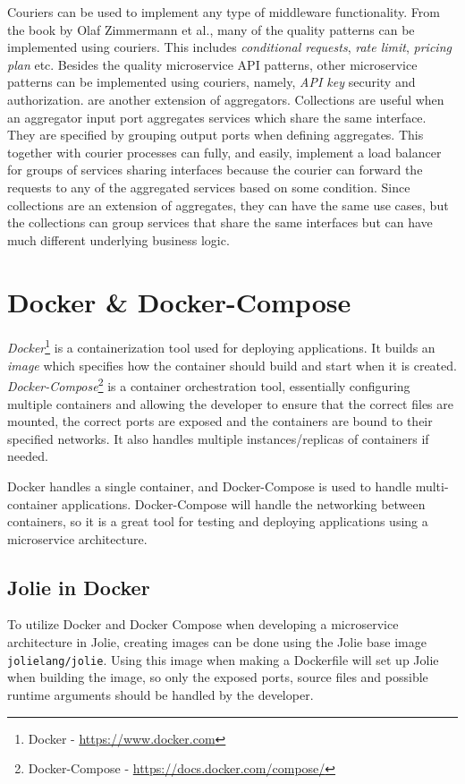 Couriers can be used to implement any type of middleware functionality. From the book by Olaf Zimmermann et al., many of the quality patterns can be implemented using couriers. This includes
\emph{conditional requests}, \emph{rate limit}, \emph{pricing plan} etc. Besides the quality microservice API patterns, other microservice patterns can be implemented using couriers, namely, \emph{API key} security and authorization.
 are another extension of aggregators. Collections are useful when an aggregator input port aggregates services which share the same interface.
They are specified by grouping output ports when defining aggregates.
This together with courier processes can fully, and easily, implement a load balancer for groups of services sharing interfaces because the courier can forward the requests to any of the aggregated services based on some condition.
Since collections are an extension of aggregates, they can have the same use cases, but the collections can group services that share the same interfaces but can have much different underlying business logic.

\section{Docker \& Docker-Compose}
\emph{Docker}\footnote{Docker - \url{https://www.docker.com}} is a containerization tool used for deploying applications. It builds an \emph{image} which specifies how the container should build and start when it is created.
\emph{Docker-Compose}\footnote{Docker-Compose - \url{https://docs.docker.com/compose/}} is a container orchestration tool, essentially configuring multiple containers and allowing the developer to ensure that the correct files are mounted, the correct ports are exposed and the containers are bound to their specified networks. It also handles multiple instances/replicas
of containers if needed.

Docker handles a single container, and Docker-Compose is used to handle multi-container applications. Docker-Compose will handle the networking between containers, so it is a great tool for testing and deploying applications using a microservice architecture.

\subsection{Jolie in Docker}
\label{label:jolie_in_docker}
To utilize Docker and Docker Compose when developing a microservice architecture in Jolie, creating images can be done using the Jolie base image \texttt{jolielang/jolie}.
Using this image when making a Dockerfile will set up Jolie when building the image, so only the exposed ports, source files and possible runtime arguments should be handled by the developer.

